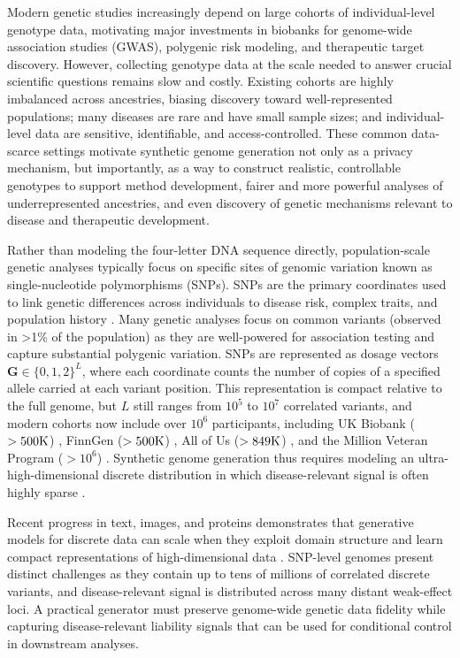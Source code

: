 \documentclass{article}
\begin{document}
Modern genetic studies increasingly depend on large cohorts of individual-level genotype data, motivating major investments in biobanks for genome-wide association studies (GWAS), polygenic risk modeling, and therapeutic target discovery. However, collecting genotype data at the scale needed to answer crucial scientific questions remains slow and costly. Existing cohorts are highly imbalanced across ancestries, biasing discovery toward well-represented populations; many diseases are rare and have small sample sizes; and individual-level data are sensitive, identifiable, and access-controlled. These common data-scarce settings motivate synthetic genome generation not only as a privacy mechanism, but importantly, as a way to construct realistic, controllable genotypes to support method development, fairer and more powerful analyses of underrepresented ancestries, and even discovery of genetic mechanisms relevant to disease and therapeutic development.

Rather than modeling the four-letter DNA sequence directly, population-scale genetic analyses typically focus on specific sites of genomic variation known as single-nucleotide polymorphisms (SNPs). SNPs are the primary coordinates used to link genetic differences across individuals to disease risk, complex traits, and population history \cite{wellcome2007genome, visscher201710, international2005haplotype, patterson2006population}. Many genetic analyses focus on common variants (observed in >1\% of the population) as they are well-powered for association testing and capture substantial polygenic variation. SNPs are represented as dosage vectors \(\boldsymbol G\in\{0,1,2\}^{L}\), where each coordinate counts the number of copies of a specified allele carried at each variant position. This representation is compact relative to the full genome, but \(L\) still ranges from $10^5$ to $10^7$ correlated variants, and modern cohorts now include over $10^6$ participants, including UK Biobank (\(>500{\rm K}\)) \cite{bycroft2018uk}, FinnGen (\(>500{\rm K}\)) \cite{kurki2023finngen}, All of Us (\(>849{\rm K}\)) \cite{all2024genomic}, and the Million Veteran Program (\(>10^6\)) \cite{gaziano2016million}. Synthetic genome generation thus requires modeling an ultra-high-dimensional discrete distribution in which disease-relevant signal is often highly sparse \cite{yang2010common, boyle2017expanded}.

Recent progress in text, images, and proteins demonstrates that generative models for discrete data can scale when they exploit domain structure and learn compact representations of high-dimensional data \cite{brown2020language,ramesh2021zero,madani2023large}. SNP-level genomes present distinct challenges as they contain up to tens of millions of correlated discrete variants, and disease-relevant signal is distributed across many distant weak-effect loci. A practical generator must preserve genome-wide genetic data fidelity while capturing disease-relevant liability signals that can be used for conditional control in downstream analyses.
\end{document}
